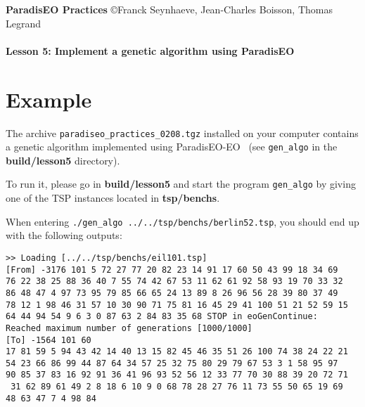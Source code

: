 \documentclass[a4paper]{article}
\begin{document}
\textbf{ParadisEO Practices}  {\copyright Franck Seynhaeve,
Jean-Charles Boisson, Thomas Legrand} \Large{\textbf{\\\\
Lesson 5: Implement a genetic algorithm using ParadisEO}}

\normalsize

 \vspace{-0,3cm}

\section{Example}

    The archive {\tt paradiseo\_practices\_0208.tgz} installed
    on your computer contains a genetic algorithm implemented using ParadisEO-EO~
    (see {\tt gen\_algo} in the {\bf build/lesson5} directory).

    \medskip
    To run it, please go in {\bf build/lesson5} and start the program {\tt gen\_algo} by giving
    one of the TSP instances located in {\bf tsp/benchs}.

    \medskip
    When entering {\tt ./gen\_algo ../../tsp/benchs/berlin52.tsp}, you should end up with the
    following outputs:

    \texttt{>> Loading [../../tsp/benchs/eil101.tsp]}\\
    \texttt{[From] -3176  101 5 72 27 77 20 82 23 14 91 17 60 50 43 99 18 34 69}\\
    \texttt{76 22 38 25 88 36 40 7 55 74 42 67 53 11 62 61 92 58 93 19 70 33 32}\\
    \texttt{86 48 47 4 97 73 95 79 85 66 65 24 13 89 8 26 96 56 28 39 80 37 49}\\
    \texttt{78 12 1 98 46 31 57 10 30 90 71 75 81 16 45 29 41 100 51 21 52 59 15}\\
    \texttt{64 44 94 54 9 6 3 0 87 63 2 84 83 35 68 STOP in eoGenContinue:}\\
    \texttt{Reached maximum number of generations [1000/1000]}\\
    \texttt{[To] -1564  101 60}\\
    \texttt{17 81 59 5 94 43 42 14 40 13 15 82 45 46 35 51 26 100 74 38 24 22 21}\\
    \texttt{54 23 66 86 99 44 87 64 34 57 25 32 75 80 29 79 67 53 3 1 58 95 97}\\
    \texttt{90 85 37 83 16 92 91 36 41 96 93 52 56 12 33 77 70 30 88 39 20 72 71}\\
    \texttt{ 31 62 89 61 49 2 8 18 6 10 9 0 68 78 28 27 76 11 73 55 50 65 19 69}\\
    \texttt{48 63 47 7 4 98 84}\\
\end{document}
